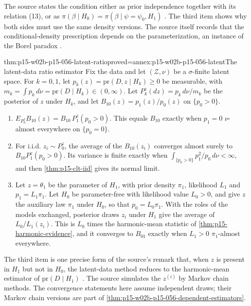 The source states the condition either as prior independence together with
its relation (13), or as \(\pi(\beta\mid H_0)=\pi(\beta\mid\psi=\psi_0,H_1)\)
\cite[Sec.~4.3, p.~780]{KassRaftery1995BayesFactors}. The third item
shows why both sides must use the same density versions. The source
itself records that the conditional-density prescription depends on the
parameterization, an instance of the Borel paradox
\cite[Sec.~5.1, p.~781]{KassRaftery1995BayesFactors}.

\begin{hbtheorem}{thm:p15-w02b-p15-056-latent-ratio}{proved=annex:p15-w02b-p15-056-latent}{The latent-data ratio estimator}
Fix the data and let \((\mathcal Z,\nu)\) be a \(\sigma\)-finite latent
space. For \(k=0,1\), let \(p_k(z)=\mathrm{pr}(D,z\mid H_k)\geq0\) be
measurable, with \(m_k=\int p_k\,d\nu=\mathrm{pr}(D\mid H_k)\in(0,\infty)\).
Let \(P^z_k(dz)=p_k\,d\nu/m_k\) be the posterior of \(z\) under \(H_k\),
and let \(B_{10}(z)=p_1(z)/p_0(z)\) on \(\{p_0>0\}\).
\begin{enumerate}
\item \(E_{P^z_0}B_{10}(z)=B_{10}\,P^z_1(p_0>0)\). This equals \(B_{10}\)
exactly when \(p_1=0\) \(\nu\)-almost everywhere on \(\{p_0=0\}\).
\item For i.i.d. \(z_i\sim P^z_0\), the average of the \(B_{10}(z_i)\)
converges almost surely to \(B_{10}P^z_1(p_0>0)\). Its variance is
finite exactly when \(\int_{\{p_0>0\}}p_1^2/p_0\,d\nu<\infty\), and then
\cref{thm:p15-clt-iid} gives its normal limit.
\item Let \(z=\theta_1\) be the parameter of \(H_1\), with prior density
\(\pi_1\), likelihood \(L_1\) and \(p_1=L_1\pi_1\). Let \(H_0\) be
parameter-free with likelihood value \(L_0>0\), and give \(z\) the
auxiliary law \(\pi_1\) under \(H_0\), so that \(p_0=L_0\pi_1\). With the
roles of the models exchanged, posterior draws \(z_i\) under \(H_1\) give
the average of \(L_0/L_1(z_i)\). This is \(L_0\) times the harmonic-mean
statistic of \cref{thm:p15-harmonic-evidence}, and it converges to
\(B_{01}\) exactly when \(L_1>0\) \(\pi_1\)-almost everywhere.
\end{enumerate}
\end{hbtheorem}

The third item is one precise form of the source's remark that, when
\(z\) is present in \(H_1\) but not in \(H_0\), the latent-data method
reduces to the harmonic-mean estimator of \(\mathrm{pr}(D\mid H_1)\)
\cite[Sec.~4.3, p.~780]{KassRaftery1995BayesFactors}. The source
simulates the \(z^{(i)}\) by Markov chain methods. The convergence
statements here assume independent draws; their Markov chain versions are
part of \cref{thm:p15-w02b-p15-056-dependent-estimators}.

